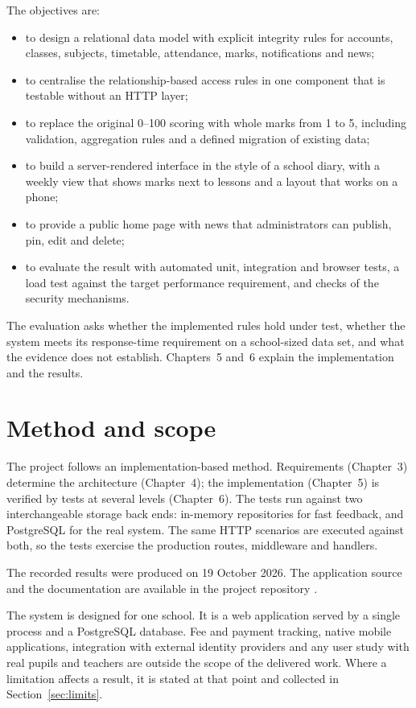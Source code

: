 The objectives are:
\begin{itemize}
  \item to design a relational data model with explicit integrity rules for accounts, classes, subjects, timetable, attendance, marks, notifications and news;
  \item to centralise the relationship-based access rules in one component that is testable without an HTTP layer;
  \item to replace the original 0--100 scoring with whole marks from 1 to 5, including validation, aggregation rules and a defined migration of existing data;
  \item to build a server-rendered interface in the style of a school diary, with a weekly view that shows marks next to lessons and a layout that works on a phone;
  \item to provide a public home page with news that administrators can publish, pin, edit and delete;
  \item to evaluate the result with automated unit, integration and browser tests, a load test against the target performance requirement, and checks of the security mechanisms.
\end{itemize}

The evaluation asks whether the implemented rules hold under test, whether the system meets its response-time requirement on a school-sized data set, and what the evidence does not establish. Chapters~5 and~6 explain the implementation and the results.

\section{Method and scope}

The project follows an implementation-based method. Requirements (Chapter~3) determine the architecture (Chapter~4); the implementation (Chapter~5) is verified by tests at several levels (Chapter~6). The tests run against two interchangeable storage back ends: in-memory repositories for fast feedback, and PostgreSQL for the real system. The same HTTP scenarios are executed against both, so the tests exercise the production routes, middleware and handlers.

The recorded results were produced on 19 October 2026. The application source and the documentation are available in the project repository \cite{repo}.

The system is designed for one school. It is a web application served by a single process and a PostgreSQL database. Fee and payment tracking, native mobile applications, integration with external identity providers and any user study with real pupils and teachers are outside the scope of the delivered work. Where a limitation affects a result, it is stated at that point and collected in Section~\ref{sec:limits}.
